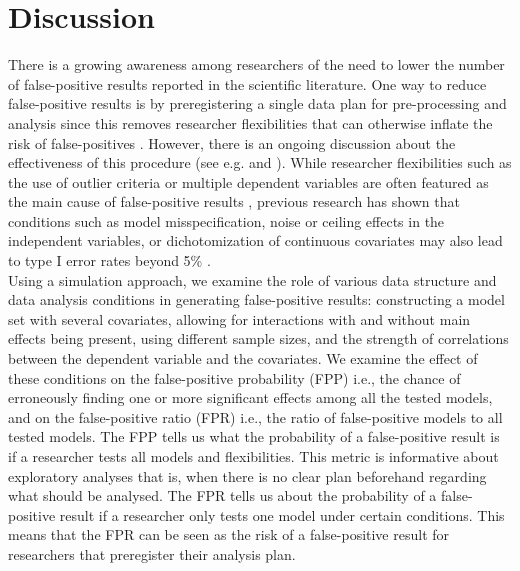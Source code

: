 \section{Discussion}
There is a growing awareness among researchers of the need to lower the number of false-positive results reported in the scientific literature. One way to reduce false-positive results is by preregistering a single data plan for pre-processing and analysis since this removes researcher flexibilities that can otherwise inflate the risk of false-positives \citep{simmons2018}. However, there is an ongoing discussion about the effectiveness of this procedure (see e.g. \cite{Pham2020} and \cite{Simmons2020}). While researcher flexibilities such as the use of outlier criteria or multiple dependent variables are often featured as the main cause of false-positive results \citep{John2012}, previous research has shown that conditions such as model misspecification, noise or ceiling effects in the independent variables, or dichotomization of continuous covariates may also lead to type I error rates beyond 5\% \citep{Dennis2019, Brunner2009, Austin2003, Austin2004,Litiere07}. \\

Using a simulation approach, we examine the role of various data structure and data analysis conditions in generating false-positive results: constructing a model set with several covariates, allowing for interactions with and without main effects being present, using different sample sizes, and the strength of correlations between the dependent variable and the covariates. We examine the effect of these conditions on the false-positive probability (FPP) i.e., the chance of erroneously finding one or more significant effects among all the tested models, and on the false-positive ratio (FPR) i.e., the ratio of  false-positive models to all tested models. The FPP tells us what the probability of a false-positive result is if a researcher tests all models and flexibilities. This metric is informative about exploratory analyses that is, when there is no clear plan beforehand regarding what should be analysed. The FPR tells us about the probability of a false-positive result if a researcher only tests one model under certain conditions. This means that the FPR can be seen as the risk of a false-positive result for researchers that preregister their analysis plan. \\

